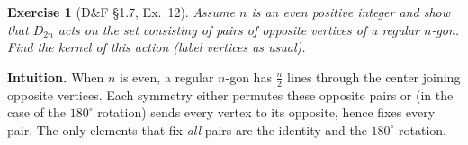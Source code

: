 \documentclass[12pt]{article}
\newtheorem{exercise}[theorem]{Exercise}
\theoremstyle{definition}
\begin{document}
\newpage

\begin{exercise}[D\&F §1.7, Ex.~12]
Assume $n$ is an even positive integer and show that $D_{2n}$ acts on the set consisting of pairs
of opposite vertices of a regular $n$-gon. Find the kernel of this action (label vertices as usual).
\end{exercise}

\dotfill

\noindent\textbf{Intuition.}
When $n$ is even, a regular $n$-gon has $\frac{n}{2}$ lines through the center joining opposite vertices.
Each symmetry either permutes these opposite pairs or (in the case of the $180^\circ$ rotation) sends
every vertex to its opposite, hence fixes every pair. The only elements that fix \emph{all} pairs are
the identity and the $180^\circ$ rotation.

\dotfill
\end{document}
